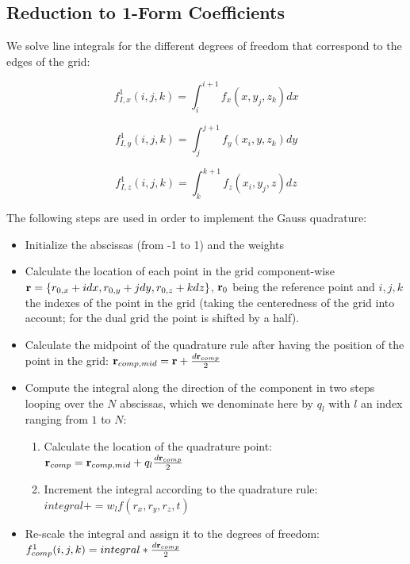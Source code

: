 \documentclass[11pt]{article}
\begin{document}
\subsection{Reduction to 1-Form Coefficients}
We solve line integrals for the different degrees of freedom that correspond to the edges of the grid:

\begin{equation}
    f_{I,x}^1(i, j, k) = \int _{i} ^ {i+1} f_x (x, y_j, z_k) dx
\end{equation}

\begin{equation}
    f_{I,y}^1(i, j, k) = \int _{j} ^ {j+1} f_y (x_i, y, z_k) dy
\end{equation}

\begin{equation}
    f_{I,z}^1(i, j, k) = \int _{k} ^ {k+1} f_z (x_i, y_j, z) dz
\end{equation}


The following steps are used in order to implement the Gauss quadrature:

\begin{itemize}
    \item Initialize the abscissas (from -1 to 1) and the weights
    \item Calculate the location of each point in the grid component-wise $\mathbf{r} = \{ r_{0,x} + idx, r_{0,y} + jdy, r_{0,z} + kdz \}$, $\mathbf{r}_0$ being the reference point and $i, j, k$ the indexes of the point in the grid (taking the centeredness of the grid into account; for the dual grid the point is shifted by a half).
    \item Calculate the midpoint of the quadrature rule after having the position of the point in the grid: $\mathbf{r}_{comp,mid} = \mathbf{r} + \frac{d\mathbf{r}_{comp}}{2}$
    \item Compute the integral along the direction of the component in two steps looping over the $N$ abscissas, which we denominate here by $q_l$ with $l$ an index ranging from $1$ to $N$:
        \begin{enumerate}
        \item Calculate the location of the quadrature point: $\mathbf{r}_{comp} = \mathbf{r}_{comp, mid} + q_l \frac{d\mathbf{r}_{comp}}{2}$
        \item Increment the integral according to the quadrature rule: $integral += w_l f(r_x, r_y, r_z, t)$
        \end{enumerate}
    \item Re-scale the integral and assign it to the degrees of freedom: $f_{comp}^1(i, j, k) = integral * \frac{d\mathbf{r}_{comp}}{2}$
\end{itemize}
\end{document}
